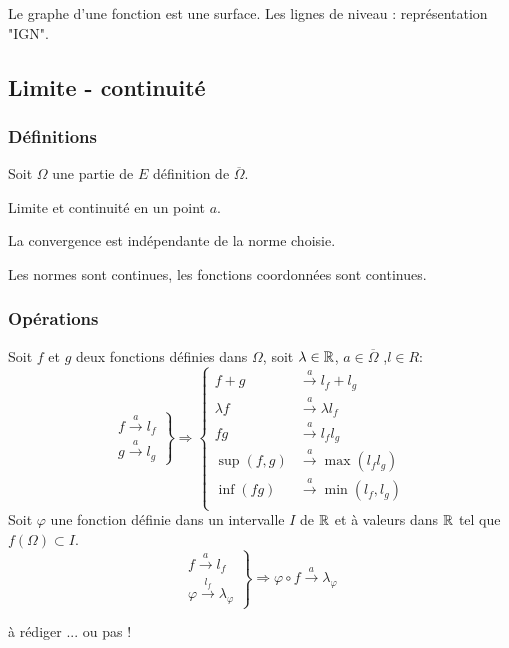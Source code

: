 Le graphe d'une fonction est une surface. Les lignes de niveau : représentation "IGN".

\subsection{Limite - continuité}
\subsubsection{Définitions}
Soit $\Omega$ une partie de $E$ définition de $\overline{\Omega}$.

Limite et continuité en un point $a$.

La convergence est indépendante de la norme choisie.

Les normes sont continues, les fonctions coordonnées sont continues.

\subsubsection{Opérations}
\begin{prop}
 Soit $f$ et $g$ deux fonctions définies dans $\Omega$, soit $\lambda\in \mathbb{R}$, $a\in \overline{\Omega}$ ,$l\in R$:
\begin{displaymath}
 \left. 
\begin{aligned}
 f\xrightarrow{a}l_f\\
 g\xrightarrow{a}l_g
\end{aligned}
\right\rbrace 
\Rightarrow 
\left\lbrace 
\begin{aligned}
 f+g &\xrightarrow{a} l_f+l_g\\
 \lambda f &\xrightarrow{a} \lambda l_f\\
 fg &\xrightarrow{a} l_fl_g\\
 \sup(f,g) &\xrightarrow{a} \max(l_fl_g)\\
 \inf(fg) &\xrightarrow{a} \min(l_f,l_g)\\
\end{aligned}
\right. 
\end{displaymath}
Soit $\varphi$ une fonction définie dans un intervalle $I$ de $\mathbb{R}$ et à valeurs dans $\mathbb{R}$ tel que $f(\Omega)\subset I$.
\begin{displaymath}
 \left. 
\begin{aligned}
 f\xrightarrow{a}l_f\\
 \varphi \xrightarrow{l_f}\lambda_\varphi
\end{aligned}
\right\rbrace 
\Rightarrow
\varphi \circ f \xrightarrow{a}\lambda_\varphi
\end{displaymath}
\end{prop}
\begin{demo}
 à rédiger ... ou pas !
\end{demo}

